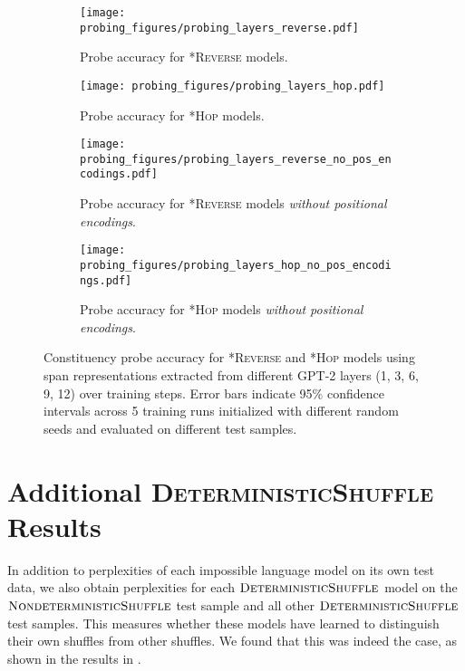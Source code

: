 \documentclass[11pt]{article}
\begin{document}
\begin{figure*}
    \centering
     \begin{subfigure}{1\textwidth}
         \centering
         \texttt{[image: probing\_figures/probing\_layers\_reverse.pdf]}
         \caption{Probe accuracy for \textsc{*Reverse} models.}
     \end{subfigure}
     \begin{subfigure}{1\textwidth}
         \centering
         \texttt{[image: probing\_figures/probing\_layers\_hop.pdf]}
         \caption{Probe accuracy for \textsc{*Hop} models.}
     \end{subfigure}
     \begin{subfigure}{1\textwidth}
         \centering
         \texttt{[image: probing\_figures/probing\_layers\_reverse\_no\_pos\_encodings.pdf]}
         \caption{Probe accuracy for \textsc{*Reverse} models \emph{without positional encodings}.}
     \end{subfigure}
     \begin{subfigure}{1\textwidth}
         \centering
         \texttt{[image: probing\_figures/probing\_layers\_hop\_no\_pos\_encodings.pdf]}
         \caption{Probe accuracy for \textsc{*Hop} models \emph{without positional encodings}.}
     \end{subfigure}
    \caption{Constituency probe accuracy for \textsc{*Reverse} and \textsc{*Hop} models using span representations extracted from different GPT-2 layers (1, 3, 6, 9, 12) over training steps. Error bars indicate 95\% confidence intervals across 5 training runs initialized with different random seeds and evaluated on different test samples.}
    \label{fig:probing_by_layer}
\end{figure*}

\section{Additional \textsc{DeterministicShuffle} Results} \label{sec:appendix-deterministic-shuffle}

In addition to perplexities of each impossible language model on its own test data, we also obtain perplexities for each $\textsc{DeterministicShuffle}$ model on the $\textsc{NondeterministicShuffle}$ test sample and all other $\textsc{DeterministicShuffle}$ test samples. This measures whether these models have learned to distinguish their own shuffles from other shuffles. We found that this was indeed the case, as shown in the results in .
\end{document}

